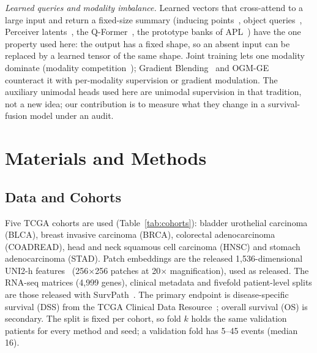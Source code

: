 \documentclass[journal]{IEEEtran}
\begin{document}
\textit{Learned queries and modality imbalance.} Learned vectors that cross-attend to a large input and return a fixed-size summary (inducing points~\cite{lee2019set}, object queries~\cite{carion2020detr}, Perceiver latents~\cite{jaegle2021perceiver,alayrac2022flamingo}, the Q-Former~\cite{li2023blip2}, the prototype banks of APL~\cite{liu2025apl}) have the one property used here: the output has a fixed shape, so an absent input can be replaced by a learned tensor of the same shape. Joint training lets one modality dominate (modality competition~\cite{huang2022competition}); Gradient Blending~\cite{wang2020gradientblending} and OGM-GE~\cite{peng2022ogmge} counteract it with per-modality supervision or gradient modulation. The auxiliary unimodal heads used here are unimodal supervision in that tradition, not a new idea; our contribution is to measure what they change in a survival-fusion model under an audit.

\section{Materials and Methods}
\label{sec:setup}

\subsection{Data and Cohorts}
Five TCGA cohorts are used (Table~\ref{tab:cohorts}): bladder urothelial carcinoma (BLCA), breast invasive carcinoma (BRCA), colorectal adenocarcinoma (COADREAD), head and neck squamous cell carcinoma (HNSC) and stomach adenocarcinoma (STAD). Patch embeddings are the released 1,536-dimensional UNI2-h features~\cite{chen2024uni,uni2hfeatures} (256$\times$256 patches at 20$\times$ magnification), used as released. The RNA-seq matrices (4,999 genes), clinical metadata and fivefold patient-level splits are those released with SurvPath~\cite{jaume2024survpath}. The primary endpoint is disease-specific survival (DSS) from the TCGA Clinical Data Resource~\cite{liu2018integrated}; overall survival (OS) is secondary. The split is fixed per cohort, so fold $k$ holds the same validation patients for every method and seed; a validation fold has 5--45 events (median 16).
\end{document}
